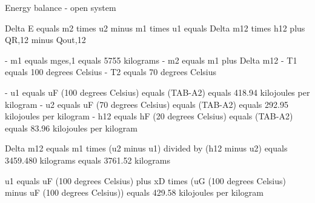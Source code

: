 Energy balance - open system  

Delta E equals m2 times u2 minus m1 times u1 equals Delta m12 times h12 plus QR,12 minus Qout,12  

- m1 equals mges,1 equals 5755 kilograms  
- m2 equals m1 plus Delta m12  
- T1 equals 100 degrees Celsius  
- T2 equals 70 degrees Celsius  

- u1 equals uF (100 degrees Celsius) equals (TAB-A2) equals 418.94 kilojoules per kilogram  
- u2 equals uF (70 degrees Celsius) equals (TAB-A2) equals 292.95 kilojoules per kilogram  
- h12 equals hF (20 degrees Celsius) equals (TAB-A2) equals 83.96 kilojoules per kilogram  

Delta m12 equals m1 times (u2 minus u1) divided by (h12 minus u2) equals 3459.480 kilograms equals 3761.52 kilograms  

u1 equals uF (100 degrees Celsius) plus xD times (uG (100 degrees Celsius) minus uF (100 degrees Celsius)) equals 429.58 kilojoules per kilogram